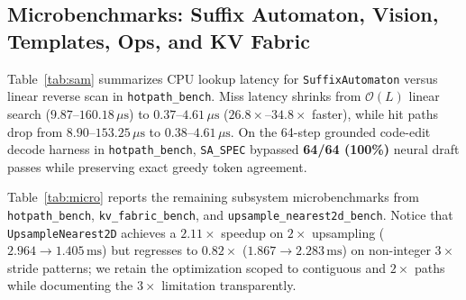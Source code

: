 \documentclass[11pt,a4paper]{article}
\begin{document}
\subsection{Microbenchmarks: Suffix Automaton, Vision, Templates, Ops, and KV Fabric}

Table~\ref{tab:sam} summarizes CPU lookup latency for \texttt{SuffixAutomaton} versus linear reverse scan in \texttt{hotpath\_bench}. Miss latency shrinks from $\mathcal{O}(L)$ linear search ($9.87$--$160.18\,\mu\text{s}$) to $0.37$--$4.61\,\mu\text{s}$ ($26.8\times$--$34.8\times$ faster), while hit paths drop from $8.90$--$153.25\,\mu\text{s}$ to $0.38$--$4.61\,\mu\text{s}$. On the 64-step grounded code-edit decode harness in \texttt{hotpath\_bench}, \texttt{SA\_SPEC} bypassed \textbf{64/64 (100\%)} neural draft passes while preserving exact greedy token agreement.

\begin{table}[ht]
\centering
{}
\caption{\texttt{SuffixAutomaton} vs naive reverse $n$-gram scan (\texttt{hotpath\_bench}, NVIDIA GB10 CPU).}
\label{tab:sam}
\end{table}

Table~\ref{tab:micro} reports the remaining subsystem microbenchmarks from \texttt{hotpath\_bench}, \texttt{kv\_fabric\_bench}, and \texttt{upsample\_nearest2d\_bench}. Notice that \texttt{UpsampleNearest2D} achieves a $2.11\times$ speedup on $2\times$ upsampling ($2.964 \to 1.405\,\text{ms}$) but regresses to $0.82\times$ ($1.867 \to 2.283\,\text{ms}$) on non-integer $3\times$ stride patterns; we retain the optimization scoped to contiguous and $2\times$ paths while documenting the $3\times$ limitation transparently.
\end{document}
